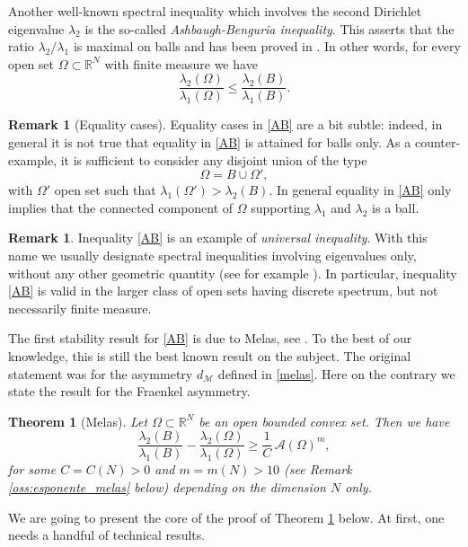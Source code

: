 \documentclass{amsart}
\newtheorem{theorem}[lemma]{Theorem}
\theoremstyle{definition}
\newtheorem{remark}[lemma]{Remark}
\numberwithin{equation}{section}
\begin{document}
Another well-known spectral inequality which involves the second Dirichlet eigenvalue $\lambda_2$ is the so-called {\it Ashbaugh-Benguria inequality}. This asserts that the ratio $\lambda_2/\lambda_1$ is maximal on balls and has been proved in \cite{MR1166646, MR1085824}. In other words, for every open set $\Omega\subset\mathbb{R}^N$ with finite measure we have
\begin{equation}
\label{AB}
\frac{\lambda_2(\Omega)}{\lambda_1(\Omega)}\le \frac{\lambda_2(B)}{\lambda_1(B)}.
\end{equation}
\begin{remark}[Equality cases]
Equality cases in \eqref{AB} are a bit subtle: indeed, in general it is not true that equality in \eqref{AB} is attained for balls only. As a counter-example, it is sufficient to consider any disjoint union of the type
\[
\Omega=B\cup \Omega',
\]
with $\Omega'$ open set such that $\lambda_1(\Omega')>\lambda_2(B)$. 
In general equality in \eqref{AB} only implies that the connected component of $\Omega$ supporting $\lambda_1$ and $\lambda_2$ is a ball. 
\end{remark}
\begin{remark}
Inequality \eqref{AB} is an example of {\it universal inequality}. With this name we usually designate spectral inequalities involving eigenvalues only, without any other geometric quantity (see for example \cite{MR1894540}). In particular, inequality \eqref{AB} is valid in the larger class of open sets having discrete spectrum, but not necessarily finite measure.
\end{remark}
The first stability result for \eqref{AB} is due to Melas, see \cite[Theorem 3.1]{MR1168980}. To the best of our knowledge, this is still the best known result on the subject. The original statement was for the asymmetry $d_\mathcal{M}$ defined in \eqref{melas}. Here on the contrary we state the result for the Fraenkel asymmetry.
\begin{theorem}[Melas]
\label{thm:melasrap}
Let $\Omega\subset\mathbb{R}^N$ be an open bounded convex set. Then we have
\begin{equation}
\label{nam}
\frac{\lambda_2(B)}{\lambda_1(B)}-\frac{\lambda_2(\Omega)}{\lambda_1(\Omega)}\ge \frac{1}{C}\, \mathcal{A}(\Omega)^{m},
\end{equation}
for some $C=C(N)>0$ and $m=m(N)>10$ (see Remark \eqref{oss:esponente_melas} below) depending on the dimension $N$ only.
\end{theorem}
We are going to present the core of the proof of Theorem \ref{thm:melasrap} below. At first, one needs a handful of technical results.
\end{document}
